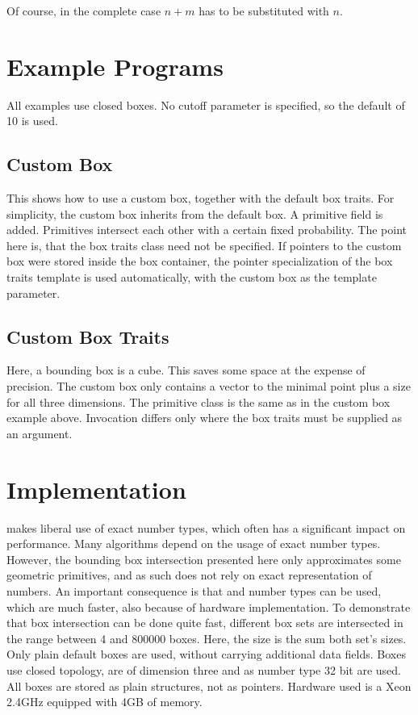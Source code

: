 Of course, in the complete case $n+m$ has to be substituted with $n$.

\section{Example Programs}

All examples use closed boxes. No cutoff parameter is specified, so
the default of 10 is used.

\subsection{Custom Box}

This shows how to use a custom box, together with the default box
traits. For simplicity, the custom box inherits from the default box.
A primitive field is added. Primitives intersect each other with a
certain fixed probability. The point here is, that the box traits
class need not be specified. If pointers to the custom box were stored
inside the box container, the pointer specialization of the box traits
template is used automatically, with the custom box as the template
parameter.


\subsection{Custom Box Traits }

Here, a bounding box is a cube. This saves some space at the expense
of precision. The custom box only contains a vector to the minimal
point plus a size for all three dimensions. The primitive class is the
same as in the custom box example above. Invocation differs only where
the box traits must be supplied as an argument.


\section{Implementation}

\cgal{} makes liberal use of exact number types, which often has a
significant impact on performance. Many algorithms depend on the usage
of exact number types. However, the bounding box intersection
presented here only approximates some geometric primitives, and as
such does not rely on exact representation of numbers. An important
consequence is that  and  number types can be
used, which are much faster, also because of hardware implementation.
To demonstrate that box intersection can be done quite fast, different
box sets are intersected in the range between 4 and 800000 boxes.
Here, the size is the sum both set's sizes. Only plain default boxes
are used, without carrying additional data fields. Boxes use closed
topology, are of dimension three and as number type 32 bit
 are used. All boxes are stored as plain structures, not
as pointers. Hardware used is a Xeon 2.4GHz equipped with 4GB of
memory.


